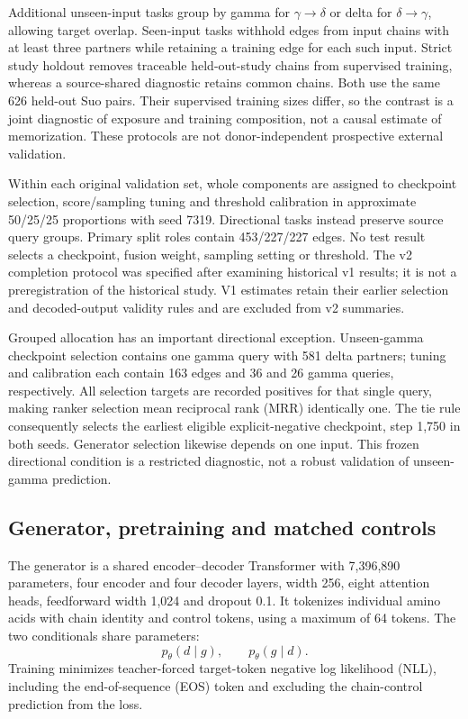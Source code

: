 \documentclass[10pt]{article}
\newcommand{\gtd}{\ensuremath{\gamma\!\rightarrow\!\delta}}
\newcommand{\dtg}{\ensuremath{\delta\!\rightarrow\!\gamma}}
\begin{document}
Additional unseen-input tasks group by gamma for \gtd{} or delta for \dtg{},
allowing target overlap. Seen-input tasks withhold edges from input chains with
at least three partners while retaining a training edge for each such input.
Strict study holdout removes traceable held-out-study chains from supervised
training, whereas a source-shared diagnostic retains common chains. Both use
the same 626 held-out Suo pairs. Their supervised training sizes differ, so the
contrast is a joint diagnostic of exposure and training composition, not a
causal estimate of memorization. These protocols are not donor-independent
prospective external validation.

Within each original validation set, whole components are assigned to checkpoint
selection, score/sampling tuning and threshold calibration in approximate
50/25/25 proportions with seed 7319. Directional tasks instead preserve source
query groups. Primary split roles contain 453/227/227 edges. No test result
selects a checkpoint, fusion weight, sampling setting or threshold. The v2
completion protocol was specified after examining historical v1 results; it is
not a preregistration of the historical study. V1 estimates retain their earlier
selection and decoded-output validity rules and are excluded from v2 summaries.

Grouped allocation has an important directional exception. Unseen-gamma
checkpoint selection contains one gamma query with 581 delta partners; tuning
and calibration each contain 163 edges and 36 and 26 gamma queries, respectively.
All selection targets are recorded positives for that single query, making
ranker selection mean reciprocal rank (MRR) identically one. The tie rule consequently selects the
earliest eligible explicit-negative checkpoint, step 1,750 in both seeds.
Generator selection likewise
depends on one input. This frozen directional condition is a restricted
diagnostic, not a robust validation of unseen-gamma prediction.

\subsection{Generator, pretraining and matched controls}
The generator is a shared encoder--decoder Transformer with 7,396,890 parameters,
four encoder and four decoder layers, width 256, eight attention heads,
feedforward width 1,024 and dropout 0.1. It tokenizes individual amino acids with
chain identity and control tokens, using a maximum of 64 tokens. The two
conditionals share parameters:
\begin{equation}
p_\theta(d\mid g),\qquad p_\theta(g\mid d).
\end{equation}
Training minimizes teacher-forced target-token negative log likelihood (NLL),
including the end-of-sequence (EOS) token and excluding the chain-control
prediction from the loss.
\end{document}
